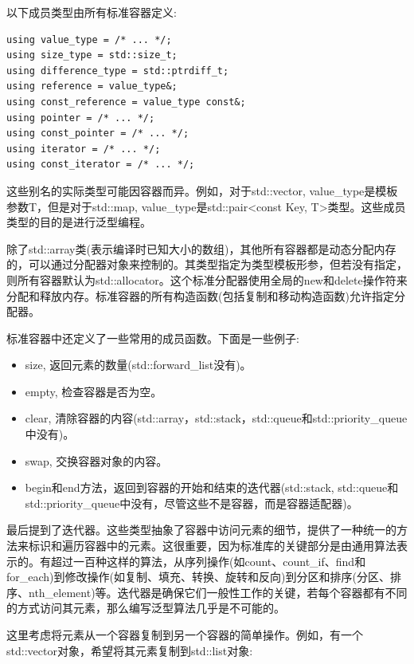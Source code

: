 以下成员类型由所有标准容器定义:

\begin{lstlisting}[style=styleCXX]
using value_type = /* ... */;
using size_type = std::size_t;
using difference_type = std::ptrdiff_t;
using reference = value_type&;
using const_reference = value_type const&;
using pointer = /* ... */;
using const_pointer = /* ... */;
using iterator = /* ... */;
using const_iterator = /* ... */;
\end{lstlisting}

这些别名的实际类型可能因容器而异。例如，对于std::vector, value\_type是模板参数T，但是对于std::map, value\_type是std::pair<const Key, T>类型。这些成员类型的目的是进行泛型编程。

除了std::array类(表示编译时已知大小的数组)，其他所有容器都是动态分配内存的，可以通过分配器对象来控制的。其类型指定为类型模板形参，但若没有指定，则所有容器默认为std::allocator。这个标准分配器使用全局的new和delete操作符来分配和释放内存。标准容器的所有构造函数(包括复制和移动构造函数)允许指定分配器。

标准容器中还定义了一些常用的成员函数。下面是一些例子:

\begin{itemize}
\item
size, 返回元素的数量(std::forward\_list没有)。

\item
empty, 检查容器是否为空。

\item
clear, 清除容器的内容(std::array，std::stack，std::queue和std::priority\_queue中没有)。

\item
swap, 交换容器对象的内容。

\item
begin和end方法，返回到容器的开始和结束的迭代器(std::stack, std::queue和std::priority\_queue中没有，尽管这些不是容器，而是容器适配器)。
\end{itemize}

最后提到了迭代器。这些类型抽象了容器中访问元素的细节，提供了一种统一的方法来标识和遍历容器中的元素。这很重要，因为标准库的关键部分是由通用算法表示的。有超过一百种这样的算法，从序列操作(如count、count\_if、find和for\_each)到修改操作(如复制、填充、转换、旋转和反向)到分区和排序(分区、排序、nth\_element)等。迭代器是确保它们一般性工作的关键，若每个容器都有不同的方式访问其元素，那么编写泛型算法几乎是不可能的。

这里考虑将元素从一个容器复制到另一个容器的简单操作。例如，有一个std::vector对象，希望将其元素复制到std::list对象:

